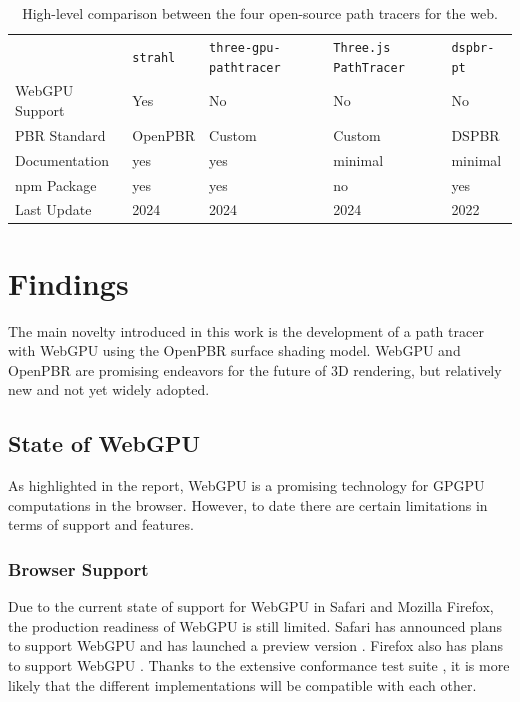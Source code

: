 \begin{table}[H]
    \centering
    \begin{tabular}{@{}p{3cm}p{2.5cm}p{2.5cm}p{2.5cm}p{2.5cm}@{}}
    \toprule
     & \texttt{strahl} & \texttt{three-gpu-} \texttt{pathtracer} \cite{ThreeJsPathTracerJohnson} & \texttt{Three.js PathTracer} \cite{ThreeJsPathTracerLoftis} & \texttt{dspbr-pt} \cite{PathTracerDassault} \\
    \gls{WebGPU} \newline Support & Yes & No & No & No \\
    \gls{PBR} Standard & \gls{OpenPBR} & Custom & Custom & \gls{DSPBR} \\
    Documentation & yes & yes & minimal & minimal \\
    \gls{npm} Package & yes & yes & no & yes \\
    Last Update & 2024 & 2024 & 2024 & 2022 \\
    \bottomrule
    \end{tabular}
    \caption{High-level comparison between the four open-source path tracers for the web.}
    \label{tab:rendererComparison}
  \end{table}

\section{Findings}

The main novelty introduced in this work is the development of a path tracer with \gls{WebGPU} using the \gls{OpenPBR} surface shading model. \gls{WebGPU} and \gls{OpenPBR} are promising endeavors for the future of 3D rendering, but relatively new and not yet widely adopted.

\subsection*{State of WebGPU}

As highlighted in the report, \gls{WebGPU} is a promising technology for \gls{GPGPU} computations in the browser. However, to date there are certain limitations in terms of support and features.

\subsubsection*{Browser Support}

Due to the current state of support for \gls{WebGPU} in Safari and Mozilla Firefox, the production readiness of \gls{WebGPU} is still limited. Safari has announced plans to support \gls{WebGPU} and has launched a preview version \cite{SafariWebGPUSupport}. Firefox also has plans to support WebGPU \cite{FirefoxWebGPUSupport}. Thanks to the extensive conformance test suite \cite{WebGPUConformanceTestSuite}, it is more likely that the different implementations will be compatible with each other.

